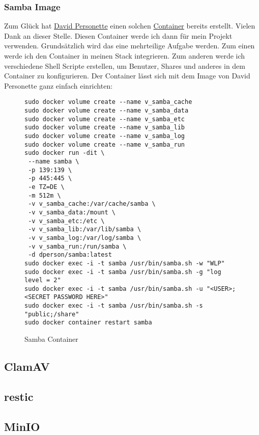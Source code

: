 \documentclass[12pt,a4paper,ngerman]{article}
\newcommand{\jpacaption}[1]{\caption{#1}\label{fig:#1}}
\begin{document}
\subsubsection{Samba Image}
Zum Glück hat \href{https://github.com/dperson}{David Personette} einen solchen
\href{https://hub.docker.com/r/dperson/samba}{Container} bereits erstellt.
Vielen Dank an dieser Stelle. Diesen Container werde ich dann für mein Projekt
verwenden. Grundsätzlich wird das eine mehrteilige Aufgabe werden. Zum einen
werde ich den Container in meinen Stack integrieren. Zum anderen werde ich
verschiedene Shell Scripte erstellen, um Benutzer, Shares und anderes in dem
Container zu konfigurieren. Der Container lässt sich mit dem Image von David
Personette ganz einfach einrichten:

\begin{figure}[H]
    \begin{lstlisting}
sudo docker volume create --name v_samba_cache
sudo docker volume create --name v_samba_data
sudo docker volume create --name v_samba_etc
sudo docker volume create --name v_samba_lib
sudo docker volume create --name v_samba_log
sudo docker volume create --name v_samba_run
sudo docker run -dit \
 --name samba \
 -p 139:139 \
 -p 445:445 \
 -e TZ=DE \
 -m 512m \
 -v v_samba_cache:/var/cache/samba \
 -v v_samba_data:/mount \
 -v v_samba_etc:/etc \
 -v v_samba_lib:/var/lib/samba \
 -v v_samba_log:/var/log/samba \
 -v v_samba_run:/run/samba \
 -d dperson/samba:latest
sudo docker exec -i -t samba /usr/bin/samba.sh -w "WLP"
sudo docker exec -i -t samba /usr/bin/samba.sh -g "log level = 2"
sudo docker exec -i -t samba /usr/bin/samba.sh -u "<USER>;<SECRET PASSWORD HERE>"
sudo docker exec -i -t samba /usr/bin/samba.sh -s "public;/share"
sudo docker container restart samba
\end{lstlisting}
    \jpacaption{Samba Container}
\end{figure}

\subsection{ClamAV}

\subsection{restic}

\subsection{MinIO}
\end{document}
